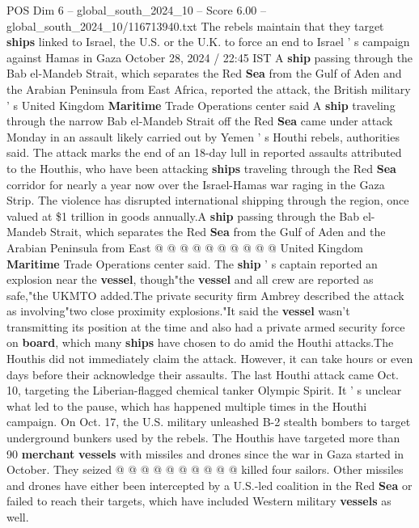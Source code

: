 \begin{textsample}{POS Dim 6 – global\_south\_2024\_10 – Score 6.00 – global\_south\_2024\_10/116713940.txt}  \label{ex:f6_pos_415}
The rebels maintain that they target \textbf{ships} linked to Israel, the U.S. or the U.K. to force an end to Israel ' s campaign against Hamas in Gaza October 28, 2024 / 22:45 IST A \textbf{ship} passing through the Bab el-Mandeb Strait, which separates the Red \textbf{Sea} from the Gulf of Aden and the Arabian Peninsula from East Africa, reported the attack, the British military ' s United Kingdom \textbf{Maritime} Trade Operations center said A \textbf{ship} traveling through the narrow Bab el-Mandeb Strait off the Red \textbf{Sea} came under attack Monday in an assault likely carried out by Yemen ' s Houthi rebels, authorities said.
The attack marks the end of an 18-day lull in reported assaults attributed to the Houthis, who have been attacking \textbf{ships} traveling through the Red \textbf{Sea} corridor for nearly a year now over the Israel-Hamas war raging in the Gaza Strip.
The violence has disrupted international shipping through the region, once valued at \$1 trillion in goods annually.A \textbf{ship} passing through the Bab el-Mandeb Strait, which separates the Red \textbf{Sea} from the Gulf of Aden and the Arabian Peninsula from East @ @ @ @ @ @ @ @ @ @ United Kingdom \textbf{Maritime} Trade Operations center said.
The \textbf{ship} ' s captain reported an explosion near the \textbf{vessel}, though"the \textbf{vessel} and all crew are reported as safe,"the UKMTO added.The private security firm Ambrey described the attack as involving"two close proximity explosions."It said the \textbf{vessel} wasn't transmitting its position at the time and also had a private armed security force on \textbf{board}, which many \textbf{ships} have chosen to do amid the Houthi attacks.The Houthis did not immediately claim the attack.
However, it can take hours or even days before their acknowledge their assaults.
The last Houthi attack came Oct. 10, targeting the Liberian-flagged chemical tanker Olympic Spirit.
It ' s unclear what led to the pause, which has happened multiple times in the Houthi campaign.
On Oct. 17, the U.S. military unleashed B-2 stealth bombers to target underground bunkers used by the rebels.
The Houthis have targeted more than 90 \textbf{merchant} \textbf{vessels} with missiles and drones since the war in Gaza started in October.
They seized @ @ @ @ @ @ @ @ @ @ killed four sailors.
Other missiles and drones have either been intercepted by a U.S.-led coalition in the Red \textbf{Sea} or failed to reach their targets, which have included Western military \textbf{vessels} as well.

\end{textsample}
